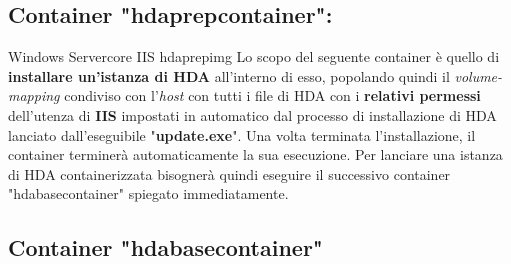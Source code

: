 \subsection{Container "hdaprepcontainer":}

\begin{namespacedesc}
	 {Windows Servercore IIS}
	 {hdaprepimg}
	 {Lo scopo del seguente container è quello di \textbf{installare un'istanza di HDA} all'interno di esso, popolando quindi il \textit{volume-mapping} condiviso con l'\textit{host} con tutti i file di HDA con i \textbf{relativi permessi} dell'utenza di \textbf{IIS} impostati in automatico dal processo di installazione di HDA lanciato dall'eseguibile "\textbf{update.exe}".
Una volta terminata l'installazione, il container terminerà automaticamente la sua esecuzione. Per lanciare una istanza di HDA containerizzata bisognerà quindi eseguire il successivo container "hdabasecontainer" spiegato immediatamente.}
\end{namespacedesc}
\newpage
\subsection{Container "hdabasecontainer"}


